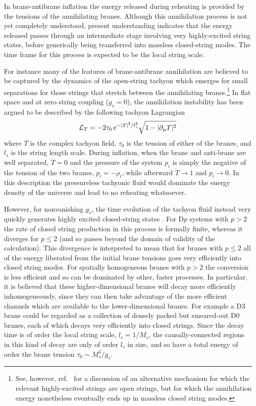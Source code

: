 \documentclass[12pt]{JHEP3}
\def\beq{\begin{equation}}
\def\eeq{\end{equation}}
\begin{document}
In brane-antibrane inflation the energy released during reheating
is provided by the tensions of the annihilating branes. Although
this annihilation process is not yet completely understood,
present understanding indicates that the energy released passes
through an intermediate stage involving very highly-excited string
states, before generically being transferred into massless
closed-string modes. The time frame for this process is expected
to be the local string scale.

For instance many of the features of brane-antibrane annihilation
are believed to be captured by the dynamics of the open-string
tachyon which emerges for small separations for those strings that
stretch between the annihilating branes.\footnote{See, however,
ref.~\cite{BraneRad} for a discussion of an alternative mechanism
for which the relevant highly-excited strings are open strings,
but for which the annihilation energy nonetheless eventually ends
up in massless closed string modes.} In flat space and at zero
string coupling ($g_s=0$), the annihilation instability has been
argued to be described by the following tachyon Lagrangian
\cite{Sen}
%
\beq \label{Sen}
    {\cal L}_T = -2\tau_0\, e^{-|T|^2/l_s^2} \sqrt{1-|\partial_\mu T|^2}
\eeq
%
where $T$ is the complex tachyon field, $\tau_0$ is the tension of
either of the branes, and $l_s$ is the string length scale. During
inflation, when the brane and anti-brane are well separated, $\dot
T = 0$ and the pressure of the system $p_i$ is simply the negative
of the tension of the two branes, $p_i=-\rho_i$, while afterward
$\dot T\to 1$ and $p_i\to 0$. In this description the pressureless
tachyonic fluid would dominate the energy density of the universe
and lead to no reheating whatsoever.

However, for nonvanishing $g_s$, the time evolution of the tachyon
fluid instead very quickly generates highly excited closed-string
states \cite{BraneDecay,Sen-review}. For D$p$ systems with $p>2$
the rate of closed string production in this process is formally
finite, whereas it diverges for $p\le 2$ (and so passes beyond the
domain of validity of the calculation). This divergence is
interpreted to mean that for branes with $p\le 2$ all of the
energy liberated from the initial brane tensions goes very
efficiently into closed string modes. For spatially homogeneous
branes with $p>2$ the conversion is less efficient and so can be
dominated by other, faster processes. In particular, it is
believed that these higher-dimensional branes will decay more
efficiently inhomogeneously, since they can then take advantage of
the more efficient channels which are available to the
lower-dimensional branes. For example a D3 brane could be regarded
as a collection of densely packed but smeared-out D0 branes, each
of which decays very efficiently into closed strings. Since the
decay time is of order the local string scale, $l_s = 1/M_s$, the
causally-connected regions in this kind of decay are only of order
$l_s$ in size, and so have a total energy of order the brane
tension $\tau_0 \sim M_s^4/g_s$.
\end{document}
